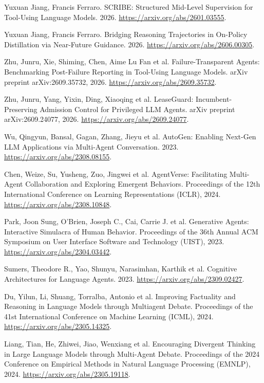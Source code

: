  Yuxuan Jiang, Francis Ferraro. {SCRIBE}: Structured Mid-Level Supervision for Tool-Using Language Models. 2026. \url{https://arxiv.org/abs/2601.03555}.

 Yuxuan Jiang, Francis Ferraro. Bridging Reasoning Trajectories in On-Policy Distillation via Near-Future Guidance. 2026. \url{https://arxiv.org/abs/2606.00305}.

 Zhu, Junru, Xie, Shiming, Chen, Aime Lu Fan et al. Failure-Transparent Agents: Benchmarking Post-Failure Reporting in Tool-Using Language Models. arXiv preprint arXiv:2609.35732, 2026. \url{https://arxiv.org/abs/2609.35732}.

 Zhu, Junru, Yang, Yixin, Ding, Xiaoqing et al. LeaseGuard: Incumbent-Preserving Admission Control for Privileged LLM Agents. arXiv preprint arXiv:2609.24077, 2026. \url{https://arxiv.org/abs/2609.24077}.

 Wu, Qingyun, Bansal, Gagan, Zhang, Jieyu et al. AutoGen: Enabling Next-Gen LLM Applications via Multi-Agent Conversation. 2023. \url{https://arxiv.org/abs/2308.08155}.

 Chen, Weize, Su, Yusheng, Zuo, Jingwei et al. {AgentVerse}: Facilitating Multi-Agent Collaboration and Exploring Emergent Behaviors. Proceedings of the 12th International Conference on Learning Representations (ICLR), 2024. \url{https://arxiv.org/abs/2308.10848}.

 Park, Joon Sung, O'Brien, Joseph C., Cai, Carrie J. et al. Generative Agents: Interactive Simulacra of Human Behavior. Proceedings of the 36th Annual ACM Symposium on User Interface Software and Technology (UIST), 2023. \url{https://arxiv.org/abs/2304.03442}.

 Sumers, Theodore R., Yao, Shunyu, Narasimhan, Karthik et al. Cognitive Architectures for Language Agents. 2023. \url{https://arxiv.org/abs/2309.02427}.

 Du, Yilun, Li, Shuang, Torralba, Antonio et al. Improving Factuality and Reasoning in Language Models through Multiagent Debate. Proceedings of the 41st International Conference on Machine Learning (ICML), 2024. \url{https://arxiv.org/abs/2305.14325}.

 Liang, Tian, He, Zhiwei, Jiao, Wenxiang et al. Encouraging Divergent Thinking in Large Language Models through Multi-Agent Debate. Proceedings of the 2024 Conference on Empirical Methods in Natural Language Processing (EMNLP), 2024. \url{https://arxiv.org/abs/2305.19118}.


